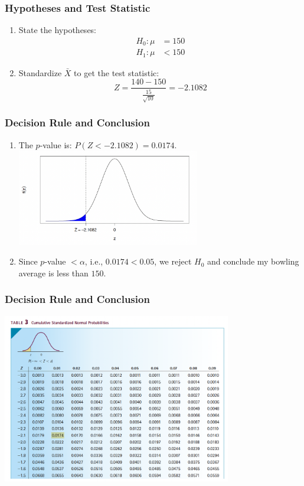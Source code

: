 \documentclass[14pt]{beamer}
\begin{document}
\begin{frame}
	\frametitle{Hypotheses and Test Statistic}
	
	\begin{enumerate}[label=\textcolor{blue}{\arabic*.}]
		\item State the hypotheses:
		\[
		\begin{aligned}
			H_0 : \mu &= 150 \\
			H_1 : \mu &< 150
		\end{aligned}
		\]
		
		\item Standardize $\bar{X}$ to get the test statistic:
		\[
		Z = \frac{140 - 150}{\frac{15}{\sqrt{10}}} = -2.1082
		\]
	\end{enumerate}
	
\end{frame}
\begin{frame}
	\frametitle{Decision Rule and Conclusion}
	
	\begin{enumerate}[label=\textcolor{blue}{\arabic*.}]
		\item The $p$-value is: $P(Z<-2.1082)=0.0174$.
		\includegraphics[width=8cm]{desision.png}
		\item Since $p$-value $<\alpha$, i.e., $0.0174<0.05$, we reject $H_0$ and conclude my bowling average is less than $150$.
	\end{enumerate}
	
\end{frame}
\begin{frame}
	\frametitle{Decision Rule and Conclusion}
\centering
\includegraphics[width=10cm]{ztable.png}	
\end{frame}
\end{document}
